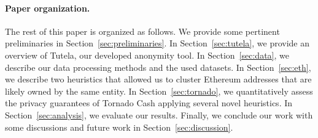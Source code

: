 \paragraph{Paper organization.} The rest of this paper is organized as follows. We provide some pertinent preliminaries in Section~\ref{sec:preliminaries}. In Section~\ref{sec:tutela}, we provide an overview of Tutela, our developed anonymity tool. In Section~\ref{sec:data}, we describe our data processing methods and the used datasets. In Section~\ref{sec:eth}, we describe two heuristics that allowed us to cluster Ethereum addresses that are likely owned by the same entity. In Section~\ref{sec:tornado}, we quantitatively assess the privacy guarantees of Tornado Cash applying several novel heuristics. In Section~\ref{sec:analysis}, we evaluate our results. Finally, we conclude our work with some discussions and future work in Section~\ref{sec:discussion}.